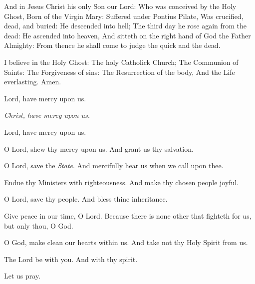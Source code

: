 And in Jesus Christ his only Son our Lord: Who was conceived by the Holy Ghost, Born of the Virgin Mary: Suffered under Pontius Pilate, Was crucified, dead, and buried: He descended into hell; The third day he rose again from the dead: He ascended into heaven, And sitteth on the right hand of God the Father Almighty: From thence he shall come to judge the quick and the dead.

I believe in the Holy Ghost: The holy Catholick Church; The Communion of Saints: The Forgiveness of sins: The Resurrection of the body, And the Life everlasting. Amen.


\bigskip
{}

\centerline{Lord, have mercy upon us.}
\centerline{\emph{Christ, have mercy upon us.}}
\centerline{Lord, have mercy upon us.}

\medskip
{}

\smallskip


\V O Lord, shew thy mercy upon us.  \R And grant us thy salvation.

\V O Lord, save the \emph{State}.  \R And mercifully hear us when we call upon thee.

\V Endue thy Ministers with righteousness.  \R And make thy chosen people joyful.

\V  O Lord, save thy people.  \R And bless thine inheritance.

\V Give peace in our time, O Lord.  \R Because there is none other that fighteth for us, but only thou, O God.

\V O God, make clean our hearts within us.  \R And take not thy Holy Spirit from us.

\V The Lord be with you.  \R And with thy spirit.

\centerline{Let us pray.}



